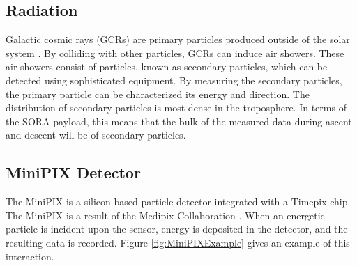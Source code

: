 \subsection{Radiation}
\label{sec: Radiation Background}

Galactic cosmic rays (GCRs) are primary particles produced outside of the solar system \cite{GCRs}.
By colliding with other particles, GCRs can induce air showers. 
These air showers consist of particles, known as secondary particles, which can be detected using sophisticated equipment.
By measuring the secondary particles, the primary particle can be characterized its energy and direction. 
The distribution of secondary particles \cite{Frank} is most dense in the troposphere. 
In terms of the SORA payload, this means that the bulk of the measured data during ascent and descent will 
be of secondary particles.

\subsection{MiniPIX Detector}
The MiniPIX \cite{silicon_sensor} is a silicon-based particle detector integrated with a Timepix \cite{timepix} chip. 
The MiniPIX is a result of the Medipix Collaboration \cite{medipix}. 
When an energetic particle is incident upon the sensor, energy is deposited in the detector, 
and the resulting data is recorded. Figure \ref{fig:MiniPIXExample} gives an example of this interaction.


